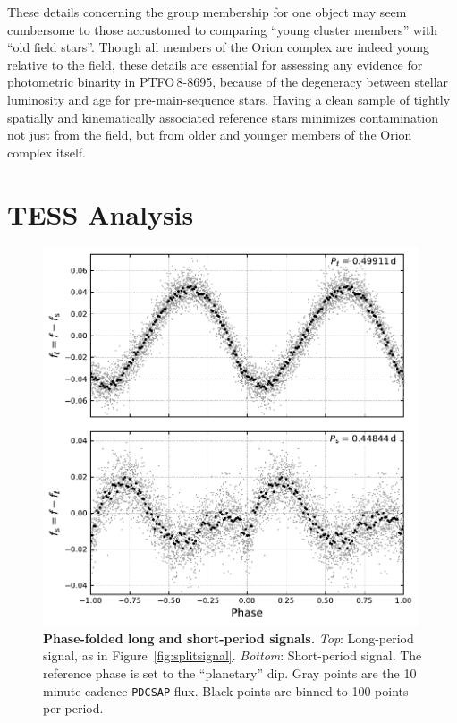\documentclass[12pt,twocolumn,tighten]{aastex62}
\newcommand{\ptfo}{PTFO$\,$8-8695}
\begin{document}
These details concerning the group membership for one object may seem
cumbersome to those accustomed to comparing ``young cluster
members'' with ``old field stars''.  Though all members of the Orion
complex are indeed young relative to the field, these details are
essential for assessing any evidence for photometric binarity in
\ptfo, because of the degeneracy between stellar luminosity and
age for pre-main-sequence stars.  Having a clean sample of tightly
spatially and kinematically associated reference stars
minimizes contamination not just from the field, but from older and
younger members of the Orion complex itself.


\section{TESS Analysis}
\label{sec:tess}

\begin{figure}[t]
	\begin{center}
		\leavevmode
		\includegraphics[width=0.99\textwidth]{f3.pdf}
	\end{center}
	\vspace{-0.7cm}
	\caption{ {\bf Phase-folded long and short-period signals.}
		{\it Top}: Long-period signal, as in Figure~\ref{fig:splitsignal}.
		{\it Bottom}: Short-period signal. The reference phase is set to the
		``planetary'' dip.  Gray points are the 10 minute cadence
		\texttt{PDCSAP} flux.  Black points are binned to 100 points per
		period.
		\label{fig:phasefold}
	}
\end{figure}
\end{document}
